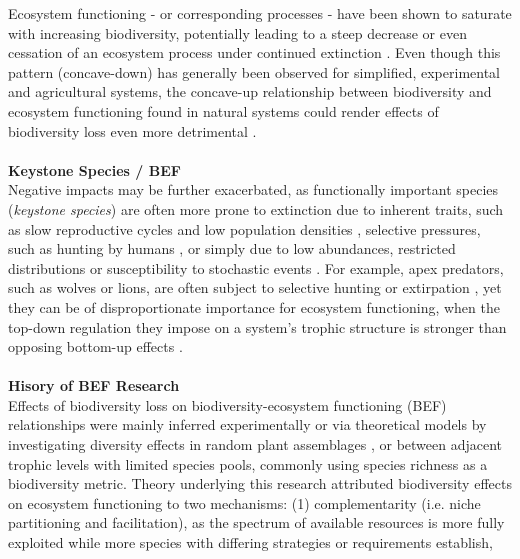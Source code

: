 Ecosystem functioning - or corresponding processes - have been shown to saturate with increasing biodiversity, potentially leading to a steep decrease or even cessation of an ecosystem process under continued extinction \citep{Cardinale2012,Tilman2014}. 
Even though this pattern (concave-down) has generally been observed for simplified, experimental and agricultural systems, the concave-up relationship between biodiversity and ecosystem functioning found in natural systems could render effects of biodiversity loss even more detrimental \citep{Cardinale2012,Mora2014}. \\\\
%
\textbf{Keystone Species / BEF}\\
Negative impacts may be further exacerbated, as functionally important species (\emph{keystone species}) are often more prone to extinction due to inherent traits, such as slow reproductive cycles and low population densities \citep{Cardillo2005}, selective pressures, such as hunting by humans \citep{Dobson2006}, or simply due to low abundances, restricted distributions or susceptibility to stochastic events \citep{MacArthur1967,Smith2003}. For example,
apex predators, such as wolves or lions, are often subject to selective hunting or extirpation \citep{Dobson2006,Ripple2014}, yet they can be of disproportionate importance for ecosystem functioning, when the top-down regulation they impose on a system's trophic structure is stronger than opposing bottom-up effects \citep{Borer2006,Estes2011}.
 \\\\
 \textbf{Hisory of BEF Research}\\
Effects of biodiversity loss on biodiversity-ecosystem functioning (BEF) relationships were mainly inferred experimentally or via theoretical models by investigating diversity effects in random plant assemblages \citep[e.g.][]{Tilman2001,Hector2007,Isbell2011}, or between adjacent trophic levels \citep[mostly plant-herbivore interactions, e.g.][]{Thebault2003,Bruno2008} with limited species pools, commonly using species richness as a biodiversity metric. Theory underlying this research attributed biodiversity effects on ecosystem functioning to two mechanisms: 
(1) complementarity (i.e. niche partitioning and facilitation), as the spectrum of available resources is more fully exploited while more species with differing strategies or requirements establish,

